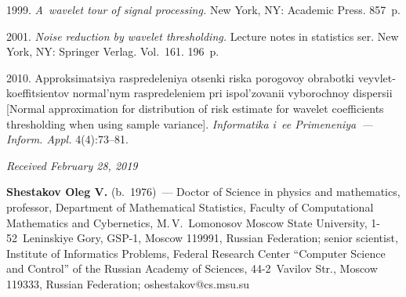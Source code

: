 \begin{multicols}{2}
{{\begin{thebibliography}{99}
 1999. 
\textit{A~wavelet tour of signal processing.} New York, NY: Academic Press. 857~p.

 2001. \textit{Noise reduction by wavelet thresholding.} 
Lecture notes in statistics ser.
New York, NY: Springer Verlag.  Vol.~161. 196~p.

 2010. 
Approksimatsiya raspredeleniya otsenki riska porogovoy obrabotki 
veyvlet-koeffitsientov normal'nym raspredeleniem pri ispol'zovanii 
vy\-bo\-roch\-noy dispersii
[Normal approximation for distribution of risk estimate for wavelet 
coefficients thresholding when using sample variance]. 
\textit{Informatika i~ee Pri\-me\-ne\-niya~--- Inform. Appl.}  4(4):73--81.
\end{thebibliography}

 }
 }

\end{multicols}

\vspace*{-6pt}

\hfill{\small\textit{Received February 28, 2019}}



\Contrl

\noindent
\textbf{Shestakov Oleg V.} (b.\ 1976)~--- 
Doctor of Science in physics and mathematics, professor, 
Department of Mathematical Statistics, Faculty of Computational Mathematics and 
Cybernetics, M.\,V.~Lomonosov Moscow State University, 1-52~Leninskiye Gory, 
GSP-1, Moscow 119991, Russian Federation; senior scientist, Institute of 
Informatics Problems, Federal Research Center ``Computer Science and Control'' 
of the Russian Academy of Sciences, 44-2~Vavilov Str., Moscow 119333, Russian 
Federation; \mbox{oshestakov@cs.msu.su}
\label{end\stat}

\renewcommand{\bibname}{\protect\rm Литература}  